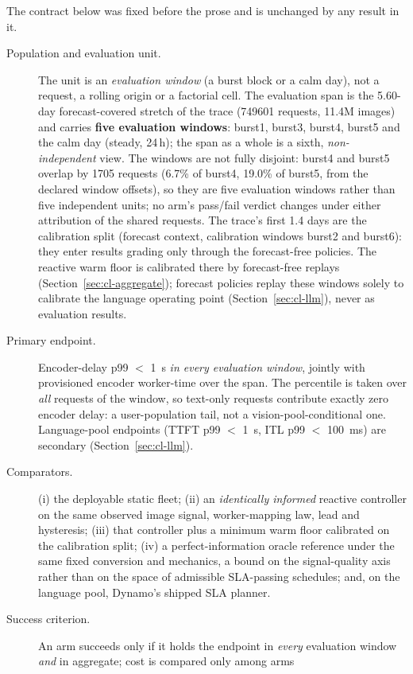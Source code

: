 The contract below was fixed before the prose and is unchanged by any result
in it.

\begin{description}
\item[Population and evaluation unit.] The unit is an \emph{evaluation
window} (a burst block or a calm day), not a request, a rolling origin or
a factorial cell. The evaluation span is the 5.60-day forecast-covered stretch
of the trace (\num{749601} requests, 11.4M images) and carries \textbf{five
evaluation windows}: burst1, burst3, burst4, burst5 and the calm day (steady,
24\,h); the span as a whole is a sixth, \emph{non-independent} view. The
windows are not fully disjoint: burst4 and burst5 overlap by \num{1705}
requests (6.7\% of burst4, 19.0\% of burst5, from the declared window
offsets), so they are five evaluation windows rather than five independent
units; no arm's pass/fail verdict changes under either attribution of the
shared requests. The trace's first 1.4
days are the calibration split (forecast context, calibration windows burst2 and burst6):
they enter results grading only through the forecast-free policies. The
reactive warm floor is calibrated there by forecast-free replays
(Section~\ref{sec:cl-aggregate}); forecast policies replay these windows
solely to calibrate the language operating point (Section~\ref{sec:cl-llm}),
never as evaluation results.
\item[Primary endpoint.] Encoder-delay p99 $<$ \SI{1}{\second} \emph{in every
evaluation window}, jointly with provisioned encoder worker-time over the span. The
percentile is taken over \emph{all} requests of the window, so text-only
requests contribute exactly zero encoder delay: a user-population tail, not a
vision-pool-conditional one. Language-pool endpoints (TTFT p99 $<$
\SI{1}{\second}, ITL p99 $<$ \SI{100}{\milli\second}) are secondary
(Section~\ref{sec:cl-llm}).
\item[Comparators.] (i) the deployable static fleet; (ii) an \emph{identically
informed} reactive controller on the same observed image signal, worker-mapping
law, lead and hysteresis; (iii) that controller plus a minimum warm floor
calibrated on the calibration split; (iv) a perfect-information oracle reference under the same fixed conversion
and mechanics, a bound on the signal-quality axis rather than on the space of
admissible SLA-passing schedules; and, on the language pool, Dynamo's shipped
SLA planner.
\item[Success criterion.] An arm succeeds only if it holds the endpoint in
\emph{every} evaluation window \emph{and} in aggregate; cost is compared only among arms

\end{description}
